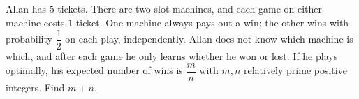 Allan has $5$ tickets. There are two slot machines, and each game on either machine costs $1$ ticket. One machine always pays out a win; the other wins with probability $\dfrac12$ on each play, independently. Allan does not know which machine is which, and after each game he only learns whether he won or lost. If he plays optimally, his expected number of wins is $\dfrac mn$ with $m,n$ relatively prime positive integers. Find $m+n$.
